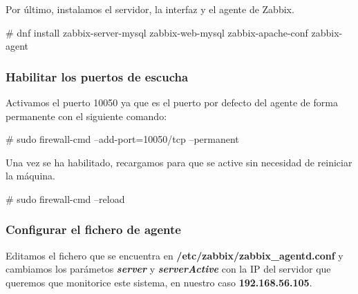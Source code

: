     Por último, instalamos el servidor, la interfaz y el agente de Zabbix.
        \begin{tcolorbox}[colback=black!10, halign=left]
            \# dnf install zabbix-server-mysql zabbix-web-mysql zabbix-apache-conf zabbix-agent
        \end{tcolorbox}

    \subsubsection{Habilitar los puertos de escucha}
    Activamos el puerto 10050 ya que es el puerto por defecto del agente de forma permanente con el siguiente comando: 
        \begin{tcolorbox}[colback=black!10, halign=left]
            \# sudo firewall-cmd --add-port=10050/tcp --permanent
        \end{tcolorbox}

    Una vez se ha habilitado, recargamos para que se active sin necesidad de reiniciar la máquina.
    \begin{tcolorbox}[colback=black!10, halign=left]
        \# sudo firewall-cmd --reload
    \end{tcolorbox}
    
    \subsubsection{Configurar el fichero de agente}
    Editamos el fichero que se encuentra en \textbf{/etc/zabbix/zabbix\_agentd.conf} y cambiamos los parámetos \textbf{\emph{server}} y \textbf{\emph{serverActive}}
    con la IP del servidor que queremos que monitorice este sistema, en nuestro caso \textbf{192.168.56.105}. 

